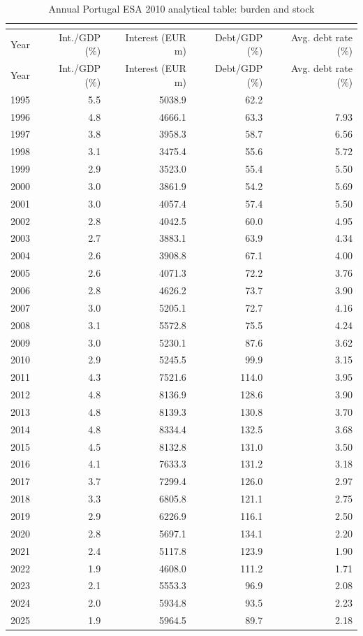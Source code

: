 \footnotesize
\begin{longtable}{rrrrr}
\caption{Annual Portugal ESA 2010 analytical table: burden and stock}\\
\label{tab:annual-all}\\
\toprule
Year & Int./GDP (\%) & Interest (EUR m) & Debt/GDP (\%) & Avg. debt rate (\%) \\
\midrule
\endfirsthead
\toprule
Year & Int./GDP (\%) & Interest (EUR m) & Debt/GDP (\%) & Avg. debt rate (\%) \\
\midrule
\endhead
1995 & 5.5 & 5038.9 & 62.2 &  \\
1996 & 4.8 & 4666.1 & 63.3 & 7.93 \\
1997 & 3.8 & 3958.3 & 58.7 & 6.56 \\
1998 & 3.1 & 3475.4 & 55.6 & 5.72 \\
1999 & 2.9 & 3523.0 & 55.4 & 5.50 \\
2000 & 3.0 & 3861.9 & 54.2 & 5.69 \\
2001 & 3.0 & 4057.4 & 57.4 & 5.50 \\
2002 & 2.8 & 4042.5 & 60.0 & 4.95 \\
2003 & 2.7 & 3883.1 & 63.9 & 4.34 \\
2004 & 2.6 & 3908.8 & 67.1 & 4.00 \\
2005 & 2.6 & 4071.3 & 72.2 & 3.76 \\
2006 & 2.8 & 4626.2 & 73.7 & 3.90 \\
2007 & 3.0 & 5205.1 & 72.7 & 4.16 \\
2008 & 3.1 & 5572.8 & 75.5 & 4.24 \\
2009 & 3.0 & 5230.1 & 87.6 & 3.62 \\
2010 & 2.9 & 5245.5 & 99.9 & 3.15 \\
2011 & 4.3 & 7521.6 & 114.0 & 3.95 \\
2012 & 4.8 & 8136.9 & 128.6 & 3.90 \\
2013 & 4.8 & 8139.3 & 130.8 & 3.70 \\
2014 & 4.8 & 8334.4 & 132.5 & 3.68 \\
2015 & 4.5 & 8132.8 & 131.0 & 3.50 \\
2016 & 4.1 & 7633.3 & 131.2 & 3.18 \\
2017 & 3.7 & 7299.4 & 126.0 & 2.97 \\
2018 & 3.3 & 6805.8 & 121.1 & 2.75 \\
2019 & 2.9 & 6226.9 & 116.1 & 2.50 \\
2020 & 2.8 & 5697.1 & 134.1 & 2.20 \\
2021 & 2.4 & 5117.8 & 123.9 & 1.90 \\
2022 & 1.9 & 4608.0 & 111.2 & 1.71 \\
2023 & 2.1 & 5553.3 & 96.9 & 2.08 \\
2024 & 2.0 & 5934.8 & 93.5 & 2.23 \\
2025 & 1.9 & 5964.5 & 89.7 & 2.18 \\
\bottomrule
\end{longtable}
